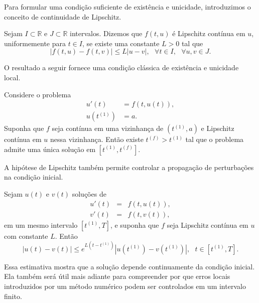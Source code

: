 Para formular uma condição suficiente de existência e unicidade, introduzimos o conceito de continuidade de Lipschitz.

\begin{defn}
Sejam $I\subset\mathbb{R}$ e $J\subset\mathbb{R}$ intervalos. Dizemos que $f(t,u)$ é Lipschitz contínua em $u$, uniformemente para $t\in I$, se existe uma constante $L>0$ tal que
\begin{equation}
 |f(t,u)-f(t,v)|\leq L|u-v|,~~~\forall t\in I,~~~\forall u,v\in J.
\end{equation}
\end{defn}

O resultado a seguir fornece uma condição clássica de existência e unicidade local.

\begin{teo}
Considere o problema
\begin{equation}\label{eq:pvi_picard}
  \begin{split}
    u'(t)  &= f(t,u(t)), \\
    u(t^{(1)}) &= a.
  \end{split}
\end{equation}
Suponha que $f$ seja contínua em uma vizinhança de $(t^{(1)},a)$ e Lipschitz contínua em $u$ nessa vizinhança. Então existe $t^{(f)}>t^{(1)}$ tal que o problema admite uma única solução em $[t^{(1)},t^{(f)}]$.
\end{teo}

A hipótese de Lipschitz também permite controlar a propagação de perturbações na condição inicial.

\begin{teo}
Sejam $u(t)$ e $v(t)$ soluções de
\begin{eqnarray}
 u'(t)&=&f(t,u(t)),\\
 v'(t)&=&f(t,v(t)),
\end{eqnarray}
em um mesmo intervalo $[t^{(1)},T]$, e suponha que $f$ seja Lipschitz contínua em $u$ com constante $L$. Então
\begin{equation}
 |u(t)-v(t)|\leq e^{L(t-t^{(1)})}|u(t^{(1)})-v(t^{(1)})|,~~~t\in[t^{(1)},T].
\end{equation}
\end{teo}

Essa estimativa mostra que a solução depende continuamente da condição inicial. Ela também será útil mais adiante para compreender por que erros locais introduzidos por um método numérico podem ser controlados em um intervalo finito.

